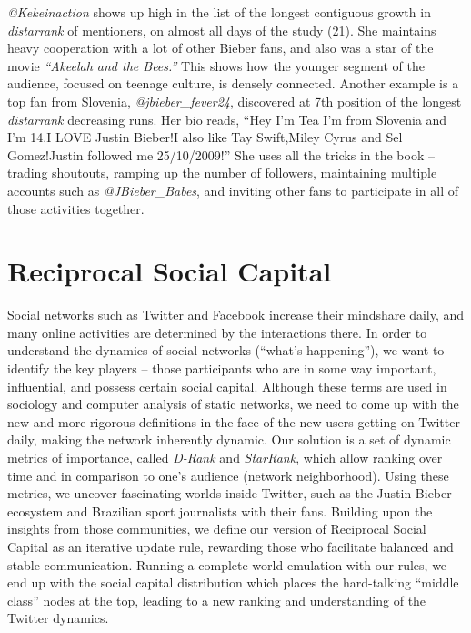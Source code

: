 \documentclass[10pt,oneside]{memoir}
\begin{document}
\begin{Spacing}{2}
{\itshape @Kekeinaction} shows up high in the list of the longest contiguous growth in {\itshape distarrank} of mentioners, on almost all days of the study (21).  She maintains heavy cooperation with a lot of other Bieber fans, and also was a star of the movie {\itshape ``Akeelah and the Bees.''} This shows how the younger segment of the audience, focused on teenage culture, is densely connected.  Another example is a top fan from Slovenia, \emph{@jbieber\_fever24}, discovered at 7th position of the longest {\itshape distarrank} decreasing runs.  Her bio reads,
``Hey I'm Tea I'm from Slovenia and I'm 14.I LOVE Justin Bieber!I also like Tay Swift,Miley Cyrus and Sel Gomez!Justin followed me 25/10/2009!''  She uses all the tricks in the book -- trading shoutouts, ramping up the number of followers, maintaining multiple accounts such as  \emph{@JBieber\_Babes}, and inviting other fans to participate in all of those activities together.


\pagebreak \chapter{Reciprocal Social Capital}
\label{reciprocalsocialcapital}

\label{chapter:social-capital}


Social networks such as Twitter and Facebook increase their mindshare daily, and many online activities are determined by the interactions there. In order to understand the dynamics of social networks (``what's happening''), we want to identify the key players -- those participants who are in some way important, influential, and possess certain social capital. Although these terms are used in sociology and computer analysis of static networks, we need to come up with the new and more rigorous definitions in the face of the new users getting on Twitter daily, making the network inherently dynamic. Our solution is a set of dynamic metrics of importance, called {\itshape D-Rank} and {\itshape StarRank}, which allow ranking over time and in comparison to one's audience (network neighborhood). Using these metrics, we uncover fascinating worlds inside Twitter, such as the Justin Bieber ecosystem and Brazilian sport journalists with their fans. Building upon the insights from those communities, we define our version of Reciprocal Social Capital as an iterative update rule, rewarding those who facilitate balanced and stable communication. Running a complete world emulation with our rules, we end up with the social capital distribution which places the hard-talking ``middle class'' nodes at the top, leading to a new ranking and understanding of the Twitter dynamics.



\end{Spacing}
\end{document}

